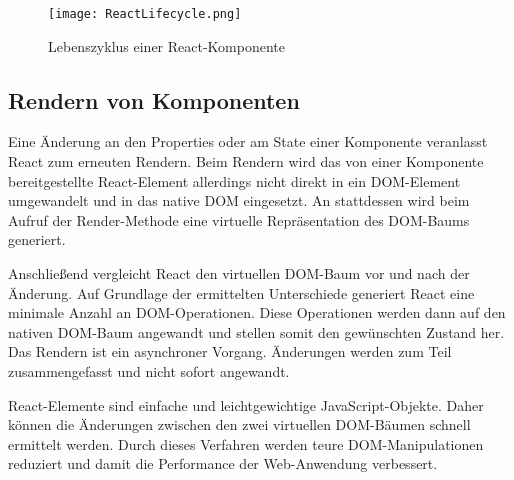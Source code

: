 
\begin{figure}
	\centering
	\texttt{[image: ReactLifecycle.png]}
	\caption{Lebenszyklus einer  React-Komponente} 
	\label{fig:LifecyleComponent}
\end{figure}



\subsection{Rendern von Komponenten}
\label{Rendern}
Eine Änderung an den Properties oder am State einer Komponente veranlasst React zum erneuten Rendern. Beim Rendern wird das von einer Komponente bereitgestellte React-Element allerdings nicht direkt in ein DOM-Element umgewandelt und in das native DOM eingesetzt. An stattdessen wird beim Aufruf der Render-Methode eine virtuelle Repräsentation des DOM-Baums generiert.

Anschließend vergleicht React den virtuellen DOM-Baum vor und nach der Änderung. Auf Grundlage der ermittelten Unterschiede generiert React eine minimale Anzahl an DOM-Operationen.  Diese Operationen werden dann auf den nativen DOM-Baum angewandt und stellen somit den gewünschten Zustand her. Das Rendern ist ein asynchroner Vorgang. Änderungen werden zum Teil zusammengefasst und nicht sofort angewandt.

React-Elemente sind einfache und leichtgewichtige JavaScript-Objekte. Daher können die Änderungen zwischen den zwei virtuellen DOM-Bäumen schnell ermittelt werden. Durch dieses Verfahren werden teure DOM-Manipulationen reduziert und damit die Performance der Web-Anwendung verbessert.\autocites[vgl.][23\psq,60\psq,90\psq]{Zeigermann.2016}[vgl.][53\psq]{Stefanov.2017}[vgl.][]{Facebook.2018}



